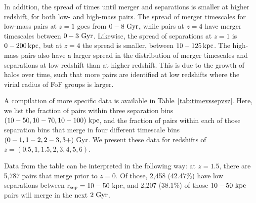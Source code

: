 \documentclass[twocolumn,linenumbers]{aastex631}
\begin{document}
    In addition, the spread of times until merger and separations is smaller at higher redshift, for both low- and high-mass pairs. 
    The spread of merger timescales for low-mass pairs at $z=1$ goes from $0-8\,\mathrm{\,Gyr}$, while pairs at $z=4$ have merger timescales between $0-3\,\mathrm{\,Gyr}$. 
    Likewise, the spread of separations at $z=1$ is $0-200\mathrm{\,kpc}$, but at $z=4$ the spread is smaller, between $10-125\mathrm{\,kpc}$. 
    The high-mass pairs also have a larger spread in the distribution of merger timescales and separations at low redshift than at higher redshift.
    This is due to the growth of halos over time, such that more pairs are identified at low redshifts where the virial radius of FoF groups is larger. 
    
    
    A compilation of more specific data is available in Table~\ref{tab:timevssepvsz}.
    Here, we list the fraction of pairs within three separation bins $(10-50, 10-70, 10-100)\,\mathrm{\,kpc}$, and the fraction of pairs within each of those separation bins that merge in four different timescale bins $(0-1, 1-2, 2-3, 3+)\,\mathrm{\,Gyr}$.
    We present these data for redshifts of $z=(0.5,1,1.5,2,3,4,5,6)$.
    
    Data from the table can be interpreted in the following way: at $z=1.5$, there are 5,787 pairs that merge prior to $z=0$. 
    Of those, 2,458 (42.47\%) have low separations between $\rm r_{sep}=10-50\,\mathrm{\,kpc}$, and 2,207 (38.1\%) of those $10-50\,\mathrm{\,kpc}$ pairs will merge in the next $2\,\mathrm{\,Gyr}$. 
    
\end{document}
